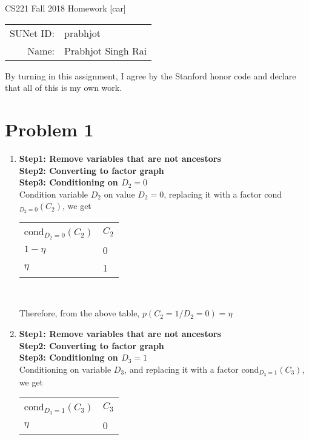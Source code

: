 \documentclass[12pt]{article}
\begin{document}
\begin{center}
{\Large CS221 Fall 2018 Homework [car]}

\begin{tabular}{rl}
SUNet ID: & prabhjot \\
Name: & Prabhjot Singh Rai
\end{tabular}
\end{center}

By turning in this assignment, I agree by the Stanford honor code and declare
that all of this is my own work.

\section*{Problem 1}

\begin{enumerate}[label=(\alph*)]
  \item 
  \textbf{Step1: Remove variables that are not ancestors} \\
  \textbf{Step2: Converting to factor graph} \\
  \textbf{Step3: Conditioning on $D_2 = 0$} \\
  Condition variable $D_2$ on value $D_2 = 0$, replacing it with a factor cond$_{D_2 = 0}(C_2)$, we get
  \begin{center}
  \begin{tabular}{ll}
  cond$_{D_2 = 0}(C_2)$ & $C_2$  \\
  $1-\eta$            & 0       \\
  $\eta$               & 1       \\
  \end{tabular} \newline \\
  \end{center}
  Therefore, from the above table, $p(C_2 = 1/ D_2 = 0) = \eta$
  \item 
  \textbf{Step1: Remove variables that are not ancestors} \\
  \textbf{Step2: Converting to factor graph} \\
  \textbf{Step3: Conditioning on $D_3 = 1$} \\
  Conditioning on variable $D_3$, and replacing it with a factor cond$_{D_3 = 1}(C_3)$, we get
  \begin{center}
  \begin{tabular}{ll}
  cond$_{D_3 = 1}(C_3)$ & $C_3$  \\
  $\eta$            & 0       \\

\end{tabular}
\end{center}
\end{enumerate}
\end{document}

